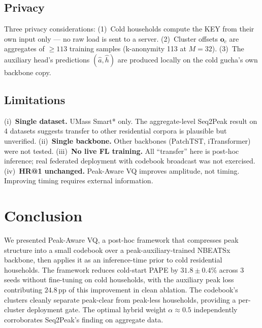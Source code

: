 \documentclass[conference]{IEEEtran}
\begin{document}
\subsection{Privacy}
Three privacy considerations: (1)~Cold households compute the KEY from
their own input only --- no raw load is sent to a server.
(2)~Cluster offsets $\mathbf{o}_c$ are aggregates of $\geq 113$ training
samples (k-anonymity 113 at $M\!=\!32$). (3)~The auxiliary head's
predictions $(\hat a, \hat h)$ are produced locally on the cold gucha's own
backbone copy.

\subsection{Limitations}
(i)~\textbf{Single dataset.} UMass Smart* only. The aggregate-level Seq2Peak
result on 4 datasets suggests transfer to other residential corpora is
plausible but unverified.
(ii)~\textbf{Single backbone.} Other backbones (PatchTST, iTransformer)
were not tested.
(iii)~\textbf{No live FL training.} All ``transfer'' here is post-hoc
inference; real federated deployment with codebook broadcast was not
exercised.
(iv)~\textbf{HR@1 unchanged.} Peak-Aware VQ improves amplitude, not timing.
Improving timing requires external information.

\section{Conclusion}\label{sec:conclusion}

We presented Peak-Aware VQ, a post-hoc framework that compresses peak
structure into a small codebook over a peak-auxiliary-trained NBEATSx
backbone, then applies it as an inference-time prior to cold residential
households. The framework reduces cold-start PAPE by
$31.8\!\pm\!0.4\%$ across 3 seeds without fine-tuning on cold households,
with the auxiliary peak loss contributing $24.8$\,pp of this improvement in
clean ablation. The codebook's clusters cleanly separate peak-clear from
peak-less households, providing a per-cluster deployment gate. The optimal
hybrid weight $\alpha\!\approx\!0.5$ independently corroborates Seq2Peak's
finding on aggregate data.



\end{document}
